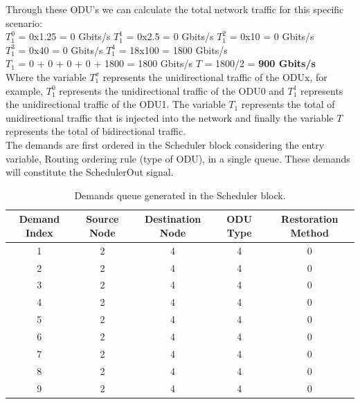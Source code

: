 \vspace{17pt}
Through these ODU's we can calculate the total network traffic for this specific scenario:\\

$T_1^0$ = 0x1.25 = 0 Gbits/s \qquad
$T_1^1$ = 0x2.5 = 0 Gbits/s \qquad
$T_1^2$ = 0x10 = 0 Gbits/s \\

$T_1^3$ = 0x40 = 0 Gbits/s \quad
$T_1^4$ = 18x100 = 1800 Gbits/s \\

$T_{1}$ = 0 + 0 + 0 + 0 + 1800 = 1800 Gbits/s \qquad
$T$ = 1800/2 = \textbf{900 Gbits/s}\\

Where the variable $T_1^x$ represents the unidirectional traffic of the ODUx, for example, $T_1^0$ represents the unidirectional traffic of the ODU0 and $T_1^1$ represents the unidirectional traffic of the ODU1. The variable $T_{1}$ represents the total of unidirectional traffic that is injected into the network and finally the variable $T$ represents the total of bidirectional traffic.\\

The demands are first ordered in the Scheduler block considering the entry variable, Routing ordering rule (type of ODU), in a single queue. These demands will constitute the SchedulerOut signal.

\begin{table}[H]
	\centering
	\begin{tabular}{| c | c | c | c | c |}
		
		\hline
		 Demand Index  & Source Node & Destination Node & ODU Type & Restoration Method \\
		\hline
		
		1 & 2 & 4 & 4 & 0\\ \hline
		2 & 2 & 4 & 4 & 0\\ \hline
		3 & 2 & 4 & 4 & 0\\ \hline
		4 & 2 & 4 & 4 & 0\\ \hline
		5 & 2 & 4 & 4 & 0\\ \hline
		6 & 2 & 4 & 4 & 0\\ \hline
		7 & 2 & 4 & 4 & 0\\ \hline
		8 & 2 & 4 & 4 & 0\\ \hline
		9 & 2 & 4 & 4 & 0\\ \hline

	\end{tabular}
	\caption{Demands queue generated in the Scheduler block.}
	\label{scheduler_example}
\end{table}

